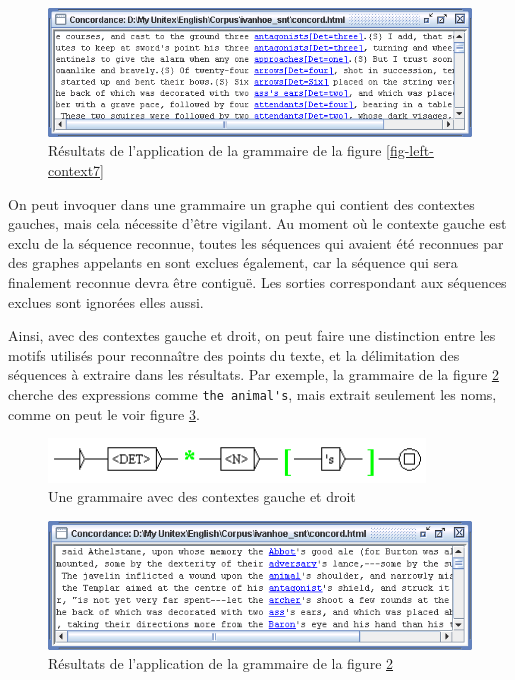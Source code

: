 \begin{figure}[!ht]
\begin{center}
\includegraphics[width=15cm]{resources/img/fig6-17h.png}
\caption{Résultats de l'application de la grammaire de la figure
\ref{fig-left-context7}\label{fig-left-context8}}
\end{center}
\end{figure}

\bigskip
\noindent On peut invoquer dans une grammaire un graphe qui contient des contextes gauches,
mais cela nécessite d'être vigilant. Au moment où le contexte gauche est exclu de la séquence reconnue,
toutes les séquences qui avaient été reconnues par des graphes appelants en sont exclues également,
car la séquence qui sera finalement reconnue devra être contiguë. Les sorties correspondant aux
séquences exclues sont ignorées elles aussi.

\bigskip
\noindent Ainsi, avec des contextes gauche et droit, on peut faire une distinction entre les motifs
utilisés pour reconnaître des points du texte, et la délimitation des séquences à extraire dans les 
résultats. Par exemple, la grammaire de la figure \ref{fig-left-context9} cherche des
expressions comme \verb$the animal's$, mais extrait seulement les noms, comme on peut le voir
figure \ref{fig-left-context10}.

\begin{figure}[!ht]
\begin{center}
\includegraphics[width=10cm]{resources/img/fig6-17i.png}
\caption{Une grammaire avec des contextes gauche et droit\label{fig-left-context9}}
\end{center}
\end{figure}

\begin{figure}[!ht]
\begin{center}
\includegraphics[width=15cm]{resources/img/fig6-17j.png}
\caption{Résultats de l'application de la grammaire de la figure
\ref{fig-left-context9}\label{fig-left-context10}}
\end{center}
\end{figure}

